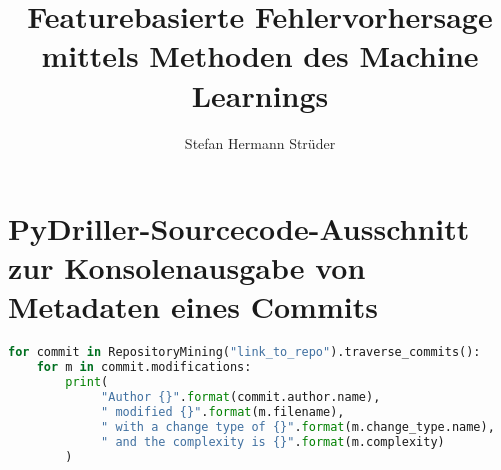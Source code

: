 \documentclass[master,twoside,extern,palatino]{rgseThesis}
\author{Stefan Hermann Strüder}
\title{Featurebasierte Fehlervorhersage mittels Methoden des Machine Learnings}
\begin{document}

    \maketitle

    
    
    
    
    

    \tableofcontents
    \cleardoublepage

    \listoffigures   %


    

    

    
    
    
    
    
    
    
    
    
    


    \printbibliography[heading=bibintoc]

\appendix

\chapter{PyDriller-Sourcecode-Ausschnitt zur Konsolenausgabe von Metadaten eines Commits}
\label{appendix4}

\begin{lstlisting}[language=Python, caption=Beispielhafter PyDriller-Code zur Ausgabe von Metadaten von Commits, frame=single, label=pydriller]
for commit in RepositoryMining("link_to_repo").traverse_commits(): 
	for m in commit.modifications: 
		print( 
		     "Author {}".format(commit.author.name),
		     " modified {}".format(m.filename),
		     " with a change type of {}".format(m.change_type.name),
		     " and the complexity is {}".format(m.complexity)
		)
\end{lstlisting}
\end{document}
